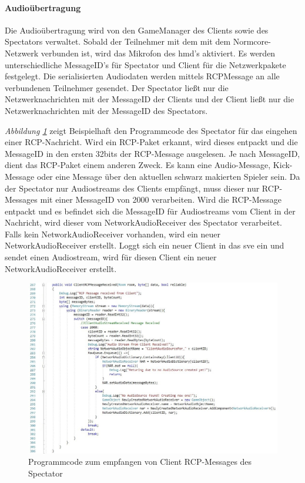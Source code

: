 \documentclass[a4paper,11pt]{article}%
\renewcommand{\\}{\vspace*{0.5\baselineskip} \newline}
\begin{document}
\paragraph{Audioübertragung}
Die Audioübertragung wird von den GameManager des Clients sowie des Spectators verwaltet. Sobald der Teilnehmer mit dem mit dem Normcore-Netzwerk verbunden ist, wird das Mikrofon des \ac{hmd}'s aktiviert. Es werden unterschiedliche MessageID's für Spectator und Client für die Netzwerkpakete festgelegt. Die serialisierten Audiodaten werden mittels RCPMessage an alle verbundenen Teilnehmer gesendet. Der Spectator ließt nur die Netzwerknachrichten mit der MessageID der Clients und der Client ließt nur die Netzwerknachrichten mit der MessageID des Spectators.

\textit{Abbildung \ref{ClientRCPMessageReceived}} zeigt Beispielhaft den Programmcode des Spectator für das eingehen einer RCP-Nachricht. Wird ein RCP-Paket erkannt, wird dieses entpackt und die MessageID in den ersten 32bits der RCP-Message ausgelesen. Je nach MessageID, dient das RCP-Paket einem anderen Zweck. Es kann eine Audio-Message, Kick-Message  oder eine Message über den aktuellen schwarz makierten Spieler sein. Da der Spectator nur Audiostreams des Clients empfängt, muss dieser nur RCP-Messages mit einer MessageID von \dq{}2000\dq{} verarbeiten. 
Wird die RCP-Message entpackt und es befindet sich die MessageID für Audiostreams vom Client  in der Nachricht, wird dieser vom \dq{}NetworkAudioReceiver\dq{} des Spectator verarbeitet.  Falls kein \dq{}NetworkAudioReceiver\dq{} vorhanden, wird ein neuer \dq{}NetworkAudioReceiver\dq{} erstellt. Loggt sich ein neuer Client in das \ac{sve} ein und sendet einen Audiostream, wird für diesen Client ein neuer \dq{}NetworkAudioReceiver\dq{} erstellt.

\begin{figure}[H]
		\begin{footnotesize}
		\centering
			\includegraphics[width=\textwidth]{Abbildungen/ClientRCPMessageReceived.jpg}
			
			\caption[Abbildung 1]{Programmcode zum empfangen von Client RCP-Messages des Spectator}
			\label{ClientRCPMessageReceived}
		\end{footnotesize}
	\end{figure}
	
\end{document}
